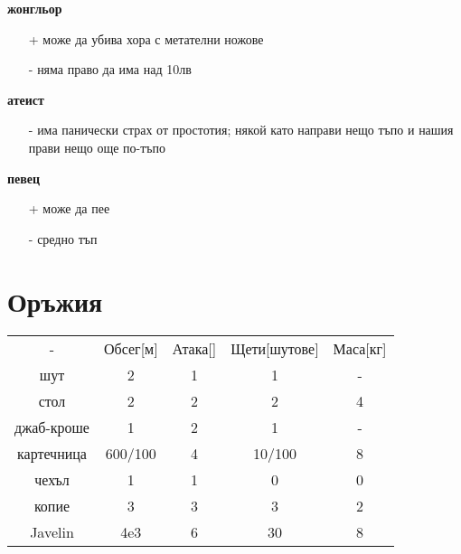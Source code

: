 \documentclass{article}
\begin{document}
\textbf{жонгльор}
\begin{itemize}
\item[+] може да убива хора с метателни ножове
\item[-] няма право да има над 10лв  \\
\end{itemize}


\textbf{атеист}
\begin{itemize}
\item[-] има панически страх от простотия; някой като направи нещо тъпо и нашия прави нещо още по-тъпо  \\
\end{itemize}


\textbf{певец}
\begin{itemize}
\item[+] може да пее
\item[-] средно тъп  \\
\end{itemize}


\section{Оръжия}
\begin{tabular}{c | c| c | c | c}
- & Обсег[м] & Атака[]  & Щети[шутове] & Маса[кг]  \\

шут & 2 & 1 & 1 & - \\
стол & 2 & 2 & 2 & 4  \\
джаб-кроше & 1 & 2 & 1 & - \\
картечница & 600/100 & 4 & 10/100 & 8\footnotemark  \\
чехъл & 1 & 1 & 0 & 0  \\
копие & 3 & 3 & 3 & 2  \\
Javelin & 4e3 & 6 & 30\footnotemark & 8 \\
\end{tabular}
\end{document}
